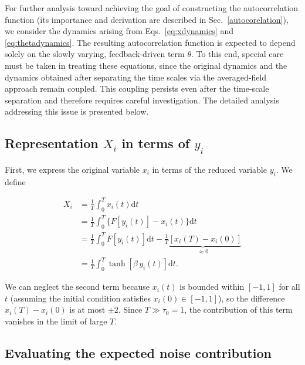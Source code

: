 \documentclass[reprint,amsmath,amssymb,aps]{revtex4-2}
\begin{document}
For further analysis toward achieving the goal of constructing the autocorrelation function (its importance and derivation are described in Sec.~\ref{autocorelation}), we consider the dynamics arising from Eqs.~\eqref{eq:xdynamics} and \eqref{eq:thetadynamics}. The resulting autocorrelation function is expected to depend solely on the slowly varying, feedback-driven term $\theta$. To this end, special care must be taken in treating these equations, since the original dynamics and the dynamics obtained after separating the time scales via the averaged-field approach remain coupled. This coupling persists even after the time-scale separation and therefore requires careful investigation. The detailed analysis addressing this issue is presented below. 

\subsection{Representation $X_i$ in terms of $y_i$}
\label{representation}

First, we express the original variable $x_i$ in terms of the reduced variable $y_i$. We define

\begin{align*}
    X_i
    &= \frac{1}{T} \int_0^T x_i(t) \mathrm{d} t  \\
    &= \frac{1}{T} \int_0^T \{F\left[y_i(t)\right] - \dot{x}_i(t)\} \mathrm{d} t
    \\
    &= \frac{1}{T} \int_0^T F\left[y_i(t)\right] \mathrm{d} t- 
    \underbrace{\frac{1}{T} \left[x_i(T) -x_i(0)\right]}_{\approx 0} \\
    &= \frac{1}{T} \int_0^T \tanh\left[ \beta \, y_i(t)\right] \mathrm{d} t.
\end{align*}

We can neglect the second term because $x_i(t)$ is bounded within $[-1,1]$ for all $t$ (assuming the initial condition satisfies $x_i(0)\in[-1,1]$), so the difference $x_i(T)-x_i(0)$ is at most $\pm 2$. Since $T \gg \tau_0 = 1$, the contribution of this term vanishes in the limit of large $T$.

\subsection{Evaluating the expected noise contribution}%
\label{noise}
\end{document}
